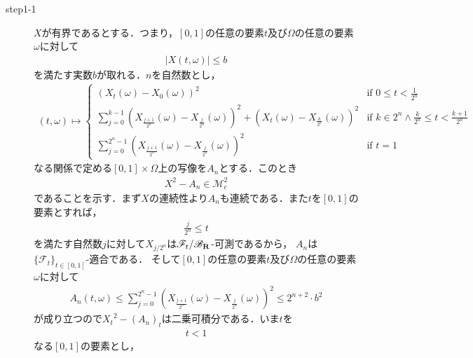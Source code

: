 	\begin{sketch}\mbox{}
		\begin{description}
			\item[step1-1] $X$が有界であるとする．つまり，$[0,1]$の任意の要素$t$及び$\Omega$の任意の要素$\omega$に対して
				\begin{align}
					|X(t,\omega)| \leq b
				\end{align}
				を満たす実数$b$が取れる．$n$を自然数とし，
				\begin{align}
					(t,\omega) \longmapsto 
					\begin{cases}
						\left( X_{t}(\omega) - X_{0}(\omega) \right)^{2} 
						&\mbox{if } {\displaystyle 0 \leq t < \frac{1}{2^{n}}} \\
						{\displaystyle \sum_{j=0}^{k-1} \left( X_{\frac{j+1}{2^{n}}}(\omega) - X_{\frac{j}{2^{n}}}(\omega) \right)^{2}
						+ \left( X_{t}(\omega) - X_{\frac{k}{2^{n}}}(\omega) \right)^{2}}
						&\mbox{if } {\displaystyle k \in 2^{n} \wedge \frac{k}{2^{n}} \leq t < \frac{k+1}{2^{n}}} \\
						{\displaystyle \sum_{j=0}^{2^{n}-1} \left( X_{\frac{j+1}{2^{n}}}(\omega) - X_{\frac{j}{2^{n}}}(\omega) \right)^{2}}
						&\mbox{if } t = 1
					\end{cases}
				\end{align}
				なる関係で定める$[0,1] \times \Omega$上の写像を$A_{n}$とする．このとき
				\begin{align}
					X^2 - A_{n} \in \mathscr{M}_{c}^{2}
					\label{fom:thm_decomposition_of_square_integrable_martingales_2}
				\end{align}
				であることを示す．まず$X$の連続性より$A_{n}$も連続である．また$t$を$[0,1]$の要素とすれば，
				\begin{align}
					\frac{j}{2^{n}} \leq t
				\end{align}
				を満たす自然数$j$に対して$X_{j/2^{n}}$は$\mathscr{F}_{t}/\mathscr{B}_{\mathbf{R}}$-可測であるから，
				$A_{n}$は$\{\mathscr{F}_t\}_{t \in [0,1]}$-適合である．
				そして$[0,1]$の任意の要素$t$及び$\Omega$の任意の要素$\omega$に対して
				\begin{align}
					A_{n}(t,\omega) 
					\leq \sum_{j=0}^{2^{n}-1} \left( X_{\frac{j+1}{2^{n}}}(\omega) - X_{\frac{j}{2^{n}}}(\omega) \right)^{2} 
					\leq 2^{n+2} \cdot b^{2}
				\end{align}
				が成り立つので${X_{t}}^{2} - (A_{n})_{t}$は二乗可積分である．いま$t$を
				\begin{align}
					t < 1
				\end{align}
				なる$[0,1]$の要素とし，

\end{description}
\end{sketch}
